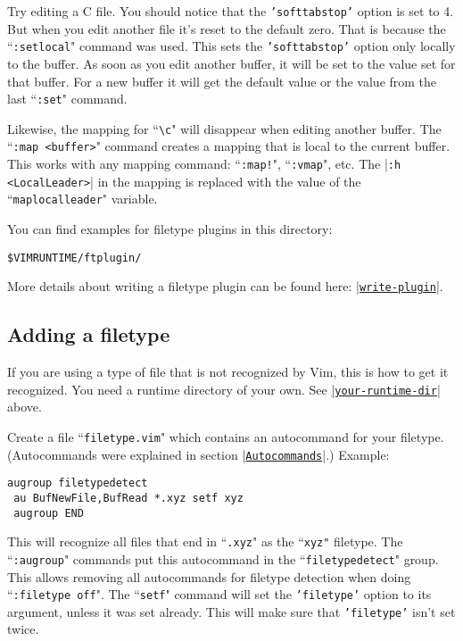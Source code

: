 Try editing a C file.
You should notice that the \texttt{'softtabstop'} option is set to 4.
But when you edit another file it's reset to the default zero.
That is because the ``\texttt{:setlocal}" command was used.
This sets the \texttt{'softtabstop'} option only locally to the buffer.
As soon as you edit another buffer, it will be set to the value set for that buffer.
For a new buffer it will get the default value or the value from the last ``\texttt{:set}" command.

Likewise, the mapping for ``\texttt{\textbackslash{}c}" will disappear when editing another buffer.
The ``\texttt{:map <buffer>}" command creates a mapping that is local to the current buffer.
This works with any mapping command: ``\texttt{:map!}", ``\texttt{:vmap}", etc.
The |\texttt{:h <LocalLeader>}| in the mapping is replaced with the value of the ``\texttt{maplocalleader}" variable.

You can find examples for filetype plugins in this directory:

\begin{Verbatim}[samepage=true]
 $VIMRUNTIME/ftplugin/
\end{Verbatim}

More details about writing a filetype plugin can be found here: \hyperref[write-plugin]{|\texttt{write-plugin}|}.
\subsection{Adding a filetype}
\label{Adding a filetype}
If you are using a type of file that is not recognized by Vim, this is how to get it recognized.
You need a runtime directory of your own.
See \hyperref[your-runtime-dir]{|\texttt{your-runtime-dir}|} above.

Create a file ``\texttt{filetype.vim}" which contains an autocommand for your filetype.
(Autocommands were explained in section |\hyperref[Autocommands]{\texttt{Autocommands}}|.)
Example:

\begin{Verbatim}[samepage=true]
 augroup filetypedetect
 au BufNewFile,BufRead *.xyz setf xyz
 augroup END
\end{Verbatim}

This will recognize all files that end in ``\texttt{.xyz}" as the ``\texttt{xyz"} filetype.
The ``\texttt{:augroup}" commands put this autocommand in the ``\texttt{filetypedetect}" group.
This allows removing all autocommands for filetype detection when doing ``\texttt{:filetype off}".
The ``\texttt{setf}" command will set the \texttt{'filetype'} option to its argument, unless it was set already.
This will make sure that \texttt{'filetype'} isn't set twice.

